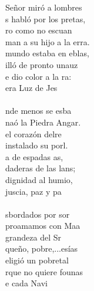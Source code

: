 \documentclass[12pt]{article}
\begin{document}
\begin{multicols*}{2}
\begin{cancion}%
	 Señor miró a lombres\\
	s habló por los pretas,\\
	ro como no escuan\\
	man a su hijo a la erra. \\
	 mundo estaba en eblas,\\
	illó de pronto unauz\\
	e dio color a la ra:\\
	era  Luz de Jes\\
\jump
	    \\
	nde menos se esba\\
	naó la Piedra Angar.\\
	 el corazón delre\\
	 instalado su porl.\\
	a de espadas as,\\
	daderas de las lans;\\
	 dignidad al humio,\\
	juscia, paz y pa\\
\jump
	   \\
	sbordados por sor\\
	proamamos con Maa \\
	 grandeza del Sr\\
	queño, pobre,...esías\\
	eligió un pobretal\\
	rque no quiere founas\\
	e cada Navi\\

\end{cancion}
\end{multicols*}
\end{document}
